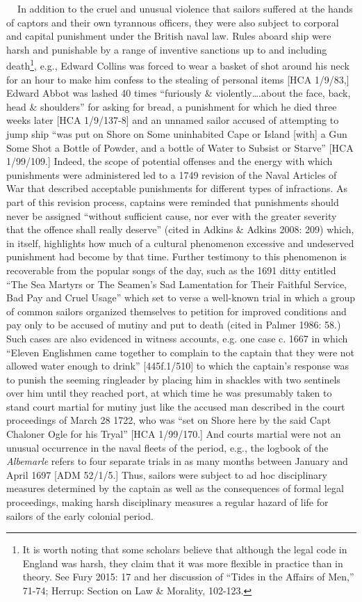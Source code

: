 \begin{styleStandard}
\textbf{\ \ }In addition to the cruel and unusual violence that sailors suffered at the hands of captors and their own tyrannous officers, they were also subject to corporal and capital punishment under the British naval law. Rules aboard ship were harsh and punishable by a range of inventive sanctions up to and including death\footnote{ It is worth noting that some scholars believe that although the legal code in England was harsh, they claim that it was more flexible in practice than in theory. See Fury 2015: 17 and her discussion of “Tides in the Affairs of Men,” 71-74; Herrup: Section on Law \& Morality, 102-123.}, e.g., Edward Collins was forced to wear a basket of shot around his neck for an hour to make him confess to the stealing of personal items [HCA 1/9/83,] Edward Abbot was lashed 40 times “furiously \& violently….about the face, back, head \& shoulders” for asking for bread, a punishment for which he died three weeks later [HCA 1/9/137-8] and an unnamed sailor accused of attempting to jump ship “was put on Shore on Some uninhabited Cape or Island [with] a Gun Some Shot a Bottle of Powder, and a bottle of Water to Subsist or Starve” [HCA 1/99/109.] Indeed, the scope of potential offenses and the energy with which punishments were administered led to a 1749 revision of the Naval Articles of War that described acceptable punishments for different types of infractions. As part of this revision process, captains were reminded that punishments should never be assigned “without sufficient cause, nor ever with the greater severity that the offence shall really deserve” (cited in Adkins \& Adkins 2008: 209) which, in itself, highlights how much of a cultural phenomenon excessive and undeserved punishment had become by that time. Further testimony to this phenomenon is recoverable from the popular songs of the day, such as the 1691 ditty entitled “The Sea Martyrs or The Seamen’s Sad Lamentation for Their Faithful Service, Bad Pay and Cruel Usage” which set to verse a well-known trial in which a group of common sailors organized themselves to petition for improved conditions and pay only to be accused of mutiny and put to death (cited in Palmer 1986: 58.) Such cases are also evidenced in witness accounts, e.g. one case c. 1667 in which “Eleven Englishmen\textit{ }came together to complain to the captain that they were not allowed water enough to drink” [445f.1/510] to which the captain’s response was to punish the seeming ringleader by placing him in shackles with two sentinels over him until they reached port, at which time he was presumably taken to stand court martial for mutiny just like the accused man described in the court proceedings of March 28 1722, who was “set on Shore here by the said Capt Chaloner Ogle for his Tryal” [HCA 1/99/170.] And courts martial were not an unusual occurrence in the naval fleets of the period, e.g., the logbook of the \textit{Albemarle} refers to four separate trials in as many months between January and April 1697 [ADM 52/1/5.] Thus, sailors were subject to ad hoc disciplinary measures determined by the captain as well as the consequences of formal legal proceedings, making harsh disciplinary measures a regular hazard of life for sailors of the early colonial period.

\end{styleStandard}
